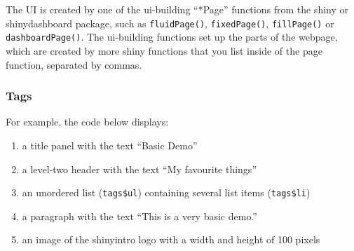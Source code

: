 \documentclass[
]{book}
\newenvironment{Shaded}{\begin{snugshade}}{\end{snugshade}}
\newcommand{\AttributeTok}[1]{\textcolor[rgb]{0.77,0.63,0.00}{#1}}
\newcommand{\FunctionTok}[1]{\textcolor[rgb]{0.00,0.00,0.00}{#1}}
\newcommand{\NormalTok}[1]{#1}
\newcommand{\OtherTok}[1]{\textcolor[rgb]{0.56,0.35,0.01}{#1}}
\newcommand{\SpecialCharTok}[1]{\textcolor[rgb]{0.00,0.00,0.00}{#1}}
\newcommand{\StringTok}[1]{\textcolor[rgb]{0.31,0.60,0.02}{#1}}
\providecommand{\tightlist}{%
  \setlength{\itemsep}{0pt}\setlength{\parskip}{0pt}}
\begin{document}
The UI is created by one of the ui-building ``*Page'' functions from the shiny or shinydashboard package, such as \texttt{fluidPage()}, \texttt{fixedPage()}, \texttt{fillPage()} or \texttt{dashboardPage()}. The ui-building functions set up the parts of the webpage, which are created by more shiny functions that you list inside of the page function, separated by commas.

\hypertarget{tags}{%
\subsubsection{Tags}\label{tags}}

For example, the code below displays:

\begin{enumerate}
\def\labelenumi{\arabic{enumi}.}
\tightlist
\item
  a title panel with the text ``Basic Demo''
\item
  a level-two header with the text ``My favourite things''
\item
  an unordered list (\texttt{tags\$ul}) containing several list items (\texttt{tags\$li})
\item
  a paragraph with the text ``This is a very basic demo.''
\item
  an image of the shinyintro logo with a width and height of 100 pixels
\end{enumerate}

\begin{Shaded}
\end{Shaded}
\end{document}
